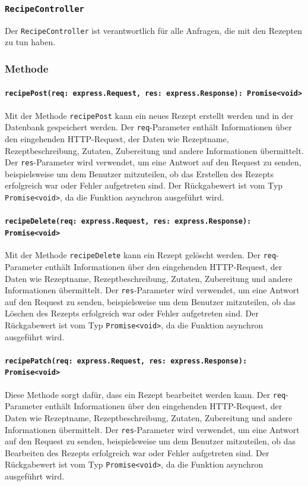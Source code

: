 \documentclass{entwurfsheft}
\begin{document}
\subsubsection{\texttt{RecipeController}}\label{sec:RecipeController}
Der \texttt{RecipeController} ist verantwortlich für alle Anfragen, die mit den Rezepten zu tun haben.
\subsubsection*{Methode}
\paragraph{\texttt{recipePost(req: express.Request, res: express.Response): Promise<void>}}
Mit der Methode \texttt{recipePost} kann ein neues Rezept erstellt werden und in der Datenbank gespeichert werden. Der \texttt{req}-Parameter enthält Informationen über den eingehenden HTTP-Request, der Daten wie Rezeptname, Rezeptbeschreibung, Zutaten, Zubereitung und andere Informationen übermittelt. Der \texttt{res}-Parameter wird verwendet, um eine Antwort auf den Request zu senden, beispielsweise um dem Benutzer mitzuteilen, ob das Erstellen des Rezepts erfolgreich war oder Fehler aufgetreten sind.
Der Rückgabewert ist vom Typ \texttt{Promise<void>}, da die Funktion asynchron ausgeführt wird.
\paragraph{\texttt{recipeDelete(req: express.Request, res: express.Response): Promise<void>}}
Mit der Methode \texttt{recipeDelete} kann ein Rezept gelöscht werden. Der \texttt{req}-Parameter enthält Informationen über den eingehenden HTTP-Request, der Daten wie Rezeptname, Rezeptbeschreibung, Zutaten, Zubereitung und andere Informationen übermittelt. Der \texttt{res}-Parameter wird verwendet, um eine Antwort auf den Request zu senden, beispielsweise um dem Benutzer mitzuteilen, ob das Löschen des Rezepts erfolgreich war oder Fehler aufgetreten sind.
Der Rückgabewert ist vom Typ \texttt{Promise<void>}, da die Funktion asynchron ausgeführt wird.
\paragraph{\texttt{recipePatch(req: express.Request, res: express.Response): Promise<void>}}
Diese Methode sorgt dafür, dass ein Rezept bearbeitet werden kann. Der \texttt{req}-Parameter enthält Informationen über den eingehenden HTTP-Request, der Daten wie Rezeptname, Rezeptbeschreibung, Zutaten, Zubereitung und andere Informationen übermittelt. Der \texttt{res}-Parameter wird verwendet, um eine Antwort auf den Request zu senden, beispielsweise um dem Benutzer mitzuteilen, ob das Bearbeiten des Rezepts erfolgreich war oder Fehler aufgetreten sind.
Der Rückgabewert ist vom Typ \texttt{Promise<void>}, da die Funktion asynchron ausgeführt wird.
\end{document}
